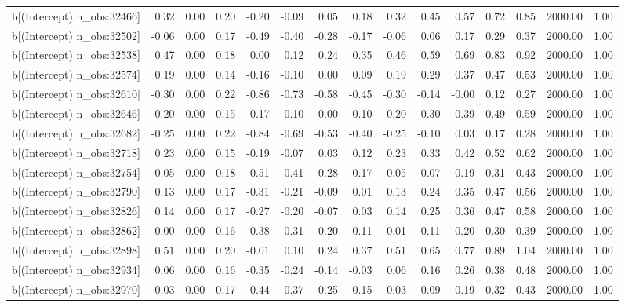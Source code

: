 \begin{table}[ht]
\begin{tabular}{rrrrrrrrrrrrrrr}
  b[(Intercept) n\_obs:32466] & 0.32 & 0.00 & 0.20 & -0.20 & -0.09 & 0.05 & 0.18 & 0.32 & 0.45 & 0.57 & 0.72 & 0.85 & 2000.00 & 1.00 \\ 
  b[(Intercept) n\_obs:32502] & -0.06 & 0.00 & 0.17 & -0.49 & -0.40 & -0.28 & -0.17 & -0.06 & 0.06 & 0.17 & 0.29 & 0.37 & 2000.00 & 1.00 \\ 
  b[(Intercept) n\_obs:32538] & 0.47 & 0.00 & 0.18 & 0.00 & 0.12 & 0.24 & 0.35 & 0.46 & 0.59 & 0.69 & 0.83 & 0.92 & 2000.00 & 1.00 \\ 
  b[(Intercept) n\_obs:32574] & 0.19 & 0.00 & 0.14 & -0.16 & -0.10 & 0.00 & 0.09 & 0.19 & 0.29 & 0.37 & 0.47 & 0.53 & 2000.00 & 1.00 \\ 
  b[(Intercept) n\_obs:32610] & -0.30 & 0.00 & 0.22 & -0.86 & -0.73 & -0.58 & -0.45 & -0.30 & -0.14 & -0.00 & 0.12 & 0.27 & 2000.00 & 1.00 \\ 
  b[(Intercept) n\_obs:32646] & 0.20 & 0.00 & 0.15 & -0.17 & -0.10 & 0.00 & 0.10 & 0.20 & 0.30 & 0.39 & 0.49 & 0.59 & 2000.00 & 1.00 \\ 
  b[(Intercept) n\_obs:32682] & -0.25 & 0.00 & 0.22 & -0.84 & -0.69 & -0.53 & -0.40 & -0.25 & -0.10 & 0.03 & 0.17 & 0.28 & 2000.00 & 1.00 \\ 
  b[(Intercept) n\_obs:32718] & 0.23 & 0.00 & 0.15 & -0.19 & -0.07 & 0.03 & 0.12 & 0.23 & 0.33 & 0.42 & 0.52 & 0.62 & 2000.00 & 1.00 \\ 
  b[(Intercept) n\_obs:32754] & -0.05 & 0.00 & 0.18 & -0.51 & -0.41 & -0.28 & -0.17 & -0.05 & 0.07 & 0.19 & 0.31 & 0.43 & 2000.00 & 1.00 \\ 
  b[(Intercept) n\_obs:32790] & 0.13 & 0.00 & 0.17 & -0.31 & -0.21 & -0.09 & 0.01 & 0.13 & 0.24 & 0.35 & 0.47 & 0.56 & 2000.00 & 1.00 \\ 
  b[(Intercept) n\_obs:32826] & 0.14 & 0.00 & 0.17 & -0.27 & -0.20 & -0.07 & 0.03 & 0.14 & 0.25 & 0.36 & 0.47 & 0.58 & 2000.00 & 1.00 \\ 
  b[(Intercept) n\_obs:32862] & 0.00 & 0.00 & 0.16 & -0.38 & -0.31 & -0.20 & -0.11 & 0.01 & 0.11 & 0.20 & 0.30 & 0.39 & 2000.00 & 1.00 \\ 
  b[(Intercept) n\_obs:32898] & 0.51 & 0.00 & 0.20 & -0.01 & 0.10 & 0.24 & 0.37 & 0.51 & 0.65 & 0.77 & 0.89 & 1.04 & 2000.00 & 1.00 \\ 
  b[(Intercept) n\_obs:32934] & 0.06 & 0.00 & 0.16 & -0.35 & -0.24 & -0.14 & -0.03 & 0.06 & 0.16 & 0.26 & 0.38 & 0.48 & 2000.00 & 1.00 \\ 
  b[(Intercept) n\_obs:32970] & -0.03 & 0.00 & 0.17 & -0.44 & -0.37 & -0.25 & -0.15 & -0.03 & 0.09 & 0.19 & 0.32 & 0.43 & 2000.00 & 1.00 \\ 

\end{tabular}
\end{table}

